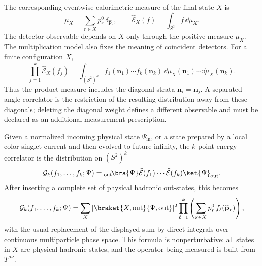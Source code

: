 The corresponding eventwise calorimetric measure of the final state \(X\) is
\[
  \mu_X
  =
  \sum_{r\in X}p_r^0\,\delta_{\widehat{\mathbf p}_r},
  \qquad
  \widehat{\mathcal E}_X(f)=\int_{S^2}f\,\dd\mu_X .
\]
The detector observable depends on \(X\) only through the positive measure
\(\mu_X\).  The multiplication model also fixes the meaning of coincident
detectors.  For a finite configuration \(X\),
\begin{equation}
  \prod_{j=1}^k\widehat{\mathcal E}_X(f_j)
  =
  \int_{(S^2)^k}
  f_1(\mathbf n_1)\cdots f_k(\mathbf n_k)\,
  \dd\mu_X(\mathbf n_1)\cdots \dd\mu_X(\mathbf n_k).
  \label{eq:energy-detector-product-measure}
\end{equation}
Thus the product measure includes the diagonal strata
\(\mathbf n_i=\mathbf n_j\).  A separated-angle correlator is the restriction
of the resulting distribution away from these diagonals; deleting the
diagonal weight defines a different observable and must be declared as an
additional measurement prescription.

Given a normalized incoming physical state \(\Psi_{\mathrm{in}}\), or a state
prepared by a local color-singlet current and then evolved to future infinity,
the \(k\)-point energy correlator is the distribution on \((S^2)^k\)
\begin{equation}
  \mathcal G_k(f_1,\ldots,f_k;\Psi)
  =
  {}_{\mathrm{out}}\!\bra{\Psi}
  \widehat{\mathcal E}(f_1)\cdots
  \widehat{\mathcal E}(f_k)
  \ket{\Psi}_{\mathrm{out}} .
  \label{eq:energy-correlator-definition}
\end{equation}
After inserting a complete set of physical hadronic out-states, this becomes
\begin{equation}
  \mathcal G_k(f_1,\ldots,f_k;\Psi)
  =
  \sum_X
  |\braket{X,\mathrm{out}}{\Psi,\mathrm{out}}|^2
  \prod_{\ell=1}^k
  \left(
    \sum_{r\in X} p_r^0\,f_\ell(\widehat{\mathbf p}_r)
  \right),
  \label{eq:energy-correlator-hadron-sum}
\end{equation}
with the usual replacement of the displayed sum by direct integrals over
continuous multiparticle phase space.  This formula is nonperturbative: all
states in \(X\) are physical hadronic states, and the operator being measured
is built from \(T^{\mu\nu}\).

